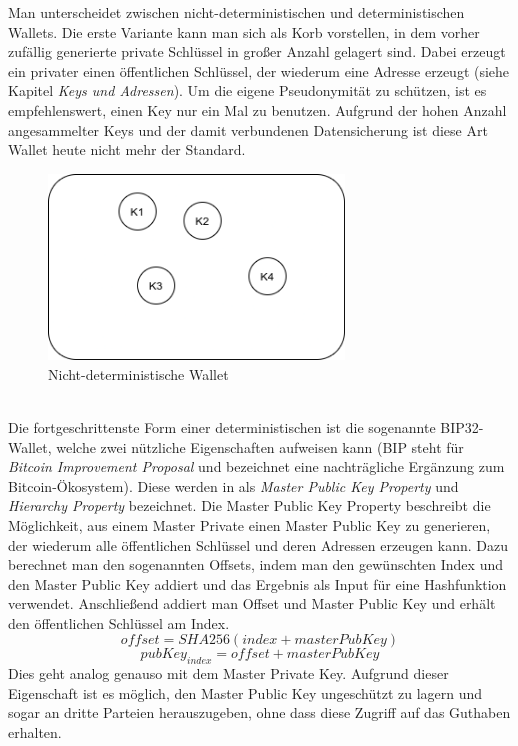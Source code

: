 Man unterscheidet zwischen nicht-deterministischen und deterministischen Wallets. Die erste Variante kann man sich als Korb vorstellen, in dem vorher zufällig generierte private Schlüssel in großer Anzahl gelagert sind. Dabei erzeugt ein privater einen öffentlichen Schlüssel, der wiederum eine Adresse erzeugt (siehe Kapitel \emph{Keys und Adressen}).
Um die eigene Pseudonymität zu schützen, ist es empfehlenswert, einen Key nur ein Mal zu benutzen. Aufgrund der hohen Anzahl angesammelter Keys und der damit verbundenen Datensicherung ist diese Art Wallet heute nicht mehr der Standard.
\begin{figure}[htpb]
	\centering
	\includegraphics[width=0.7\textwidth]{images/non_det_wallet.png}
	\caption{Nicht-deterministische Wallet}
	\label{6braun:fig:non-deterministic_wallet}
\end{figure}\\
Die fortgeschrittenste Form einer deterministischen ist die sogenannte BIP32-Wallet, welche zwei nützliche Eigenschaften aufweisen kann (BIP steht für \emph{Bitcoin Improvement Proposal} und bezeichnet eine nachträgliche Ergänzung zum Bitcoin-Ökosystem).
Diese werden in \cite{buterin_2013} als \emph{Master Public Key Property} und \emph{Hierarchy Property} bezeichnet.
Die Master Public Key Property beschreibt die Möglichkeit, aus einem Master Private einen Master Public Key zu generieren, der wiederum alle öffentlichen Schlüssel und deren Adressen erzeugen kann. Dazu berechnet man den sogenannten Offsets, indem man den gewünschten Index und den Master Public Key addiert und das Ergebnis als Input für eine Hashfunktion verwendet. Anschließend addiert man Offset und Master Public Key und erhält den öffentlichen Schlüssel am Index.
$$offset = SHA256(index + masterPubKey)$$
$$pubKey_{index} = offset + masterPubKey$$ Dies geht analog genauso mit dem Master Private Key. 
Aufgrund dieser Eigenschaft ist es möglich, den Master Public Key ungeschützt zu lagern und sogar an dritte Parteien herauszugeben, ohne dass diese Zugriff auf das Guthaben erhalten.\\

